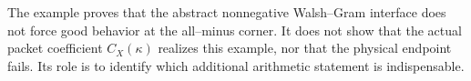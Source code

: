 \begin{remark}
\label{rem:tpc44-obstruction-scope}
The example proves that the abstract nonnegative Walsh--Gram interface
does not force good behavior at the all--minus corner.  It does not show
that the actual packet coefficient \(C_X(\kappa)\) realizes this example,
nor that the physical endpoint fails.  Its role is to identify which
additional arithmetic statement is indispensable.
\end{remark}
